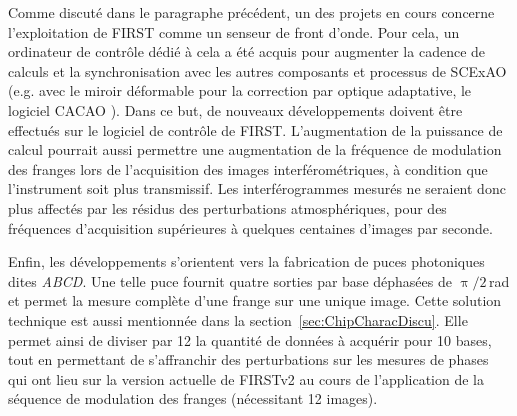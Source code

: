 Comme discuté dans le paragraphe précédent, un des projets en cours concerne l'exploitation de \ac{FIRST} comme un senseur de front d'onde. Pour cela, un ordinateur de contrôle dédié à cela a été acquis pour augmenter la cadence de calculs et la synchronisation avec les autres composants et processus de \ac{SCExAO} (e.g. avec le miroir déformable pour la correction par optique adaptative, le logiciel \ac{CACAO} \citep{guyon2020}). Dans ce but, de nouveaux développements doivent être effectués sur le logiciel de contrôle de \ac{FIRST}. L'augmentation de la puissance de calcul pourrait aussi permettre une augmentation de la fréquence de modulation des franges lors de l'acquisition des images interférométriques, à condition que l'instrument soit plus transmissif. Les interférogrammes mesurés ne seraient donc plus affectés par les résidus des perturbations atmosphériques, pour des fréquences d'acquisition supérieures à quelques centaines d'images par seconde.

Enfin, les développements s'orientent vers la fabrication de puces photoniques dites \textit{ABCD}. Une telle puce fournit quatre sorties par base déphasées de $\uppi / 2 \,$rad et permet la mesure complète d'une frange sur une unique image. Cette solution technique est aussi mentionnée dans la section~\ref{sec:ChipCharacDiscu}. Elle permet ainsi de diviser par 12 la quantité de données à acquérir pour 10 bases, tout en permettant de s'affranchir des perturbations sur les mesures de phases qui ont lieu sur la version actuelle de \ac{FIRSTv2} au cours de l'application de la séquence de modulation des franges (nécessitant 12 images).


